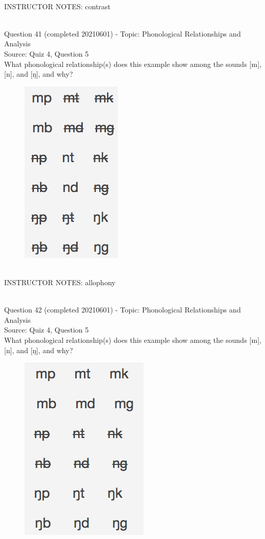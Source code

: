 \documentclass[12pt]{article}
\begin{document}
~\\
INSTRUCTOR NOTES: contrast


~\\

{\large Question 41} (completed 20210601) - Topic: Phonological Relationships and Analysis\\
Source: Quiz 4, Question 5\\

What phonological relationship(s) does this example show among the sounds [m], [n], and [ŋ], and why?\\

\begin{figure}[H]
\includegraphics{../images/quiz4question5_b.png}
\end{figure}

~\\
INSTRUCTOR NOTES: allophony


~\\

{\large Question 42} (completed 20210601) - Topic: Phonological Relationships and Analysis\\
Source: Quiz 4, Question 5\\

What phonological relationship(s) does this example show among the sounds [m], [n], and [ŋ], and why?\\

\begin{figure}[H]
\includegraphics{../images/quiz4question5_c.png}
\end{figure}
\end{document}
